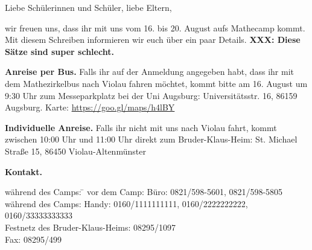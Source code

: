 \documentclass[12pt]{zettel}
\begin{document}
\renewcommand{\betreff}{Mathecamp des Matheschülerzirkels Augsburg vom 16. bis
20. August}

\makeletterhead{}
\vspace{-2em}

Liebe Schülerinnen und Schüler, liebe Eltern,

wir freuen uns, dass ihr mit uns vom 16. bis 20. August aufs Mathecamp kommt.
Mit diesem Schreiben informieren wir euch über ein paar Details.
\textbf{XXX: Diese Sätze sind super schlecht.}

\begin{shaded}
\textbf{Anreise per Bus.} Falls ihr auf der Anmeldung angegeben habt, dass ihr mit dem
Mathezirkelbus nach Violau fahren möchtet, kommt bitte am 16. August um
9:30 Uhr zum Messeparkplatz bei der Uni Augsburg: Universitätsstr. 16, 86159
Augsburg. Karte: \url{https://goo.gl/maps/h4lBY}

\textbf{Individuelle Anreise.} Falls ihr nicht mit uns nach Violau fahrt, kommt
zwischen 10:00 Uhr und 11:00 Uhr direkt zum Bruder-Klaus-Heim:
St. Michael Straße 15, 86450 Violau-Altenmünster
\end{shaded}

\begin{shaded}
\textbf{Kontakt.}
\begin{tabbing}
  während des Camps: \= \kill
  vor dem Camp: \> Büro: 0821/598-5601, 0821/598-5805 \\
  während des Camps: \> Handy: 0160/1111111111, 0160/2222222222, 0160/33333333333 \\
  \> Festnetz des Bruder-Klaus-Heims: 08295/1097 \\
  \> Fax: 08295/499
\end{tabbing}
\end{shaded}
\end{document}
